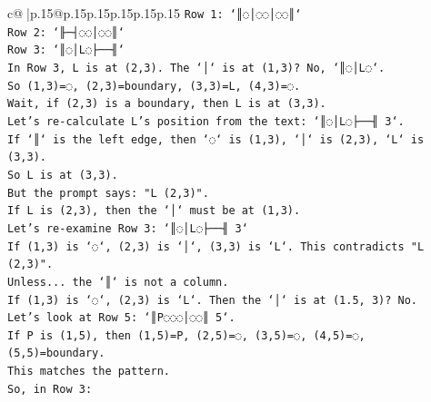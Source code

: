 \documentclass{article}
\begin{document}
{\begin{supertabular}{c@{$\;$}|p{.15\linewidth}@{}p{.15\linewidth}p{.15\linewidth}p{.15\linewidth}p{.15\linewidth}p{.15\linewidth}}
{{{\texttt{Row 1: `║◌│◌◌│◌◌║`} \\
\texttt{Row 2: `╟─┤◌◌│◌◌║`} \\
\texttt{Row 3: `║◌│L◌├──╢`} \\
\texttt{In Row 3, L is at (2,3). The `│` is at (1,3)? No, `║◌│L◌`.} \\
\texttt{So (1,3)=◌, (2,3)=boundary, (3,3)=L, (4,3)=◌.} \\
\texttt{Wait, if (2,3) is a boundary, then L is at (3,3).} \\
\texttt{Let's re{-}calculate L's position from the text: `║◌│L◌├──╢ 3`.} \\
\texttt{If `║` is the left edge, then `◌` is (1,3), `│` is (2,3), `L` is (3,3).} \\
\texttt{So L is at (3,3).} \\
\texttt{But the prompt says: "L (2,3)".} \\
\texttt{If L is (2,3), then the `│` must be at (1,3).} \\
\texttt{Let's re{-}examine Row 3: `║◌│L◌├──╢ 3`} \\
\texttt{If (1,3) is `◌`, (2,3) is `│`, (3,3) is `L`. This contradicts "L (2,3)".} \\
\texttt{Unless... the `║` is not a column.} \\
\texttt{If (1,3) is `◌`, (2,3) is `L`. Then the `│` is at (1.5, 3)? No.} \\
\texttt{Let's look at Row 5: `║P◌◌◌│◌◌║ 5`.} \\
\texttt{If P is (1,5), then (1,5)=P, (2,5)=◌, (3,5)=◌, (4,5)=◌, (5,5)=boundary.} \\
\texttt{This matches the pattern.} \\
\texttt{So, in Row 3:} \\
            }
        }
    }
     \\ \\


\end{supertabular}}
\end{document}
